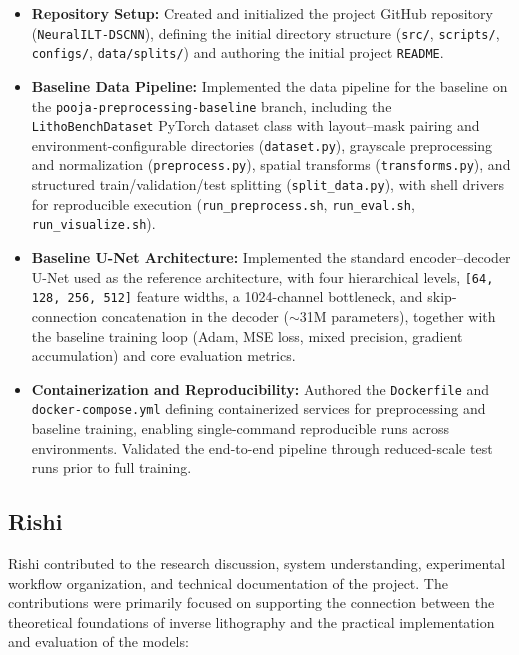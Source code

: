 \documentclass[conference]{IEEEtran}
\begin{document}
\begin{itemize}
    \item \textbf{Repository Setup:} Created and initialized the project GitHub repository (\texttt{NeuralILT-DSCNN}), defining the initial directory structure (\texttt{src/}, \texttt{scripts/}, \texttt{configs/}, \texttt{data/splits/}) and authoring the initial project \texttt{README}.

    \item \textbf{Baseline Data Pipeline:} Implemented the data pipeline for the baseline on the \texttt{pooja-preprocessing-baseline} branch, including the \texttt{LithoBenchDataset} PyTorch dataset class with layout--mask pairing and environment-configurable directories (\texttt{dataset.py}), grayscale preprocessing and normalization (\texttt{preprocess.py}), spatial transforms (\texttt{transforms.py}), and structured train/validation/test splitting (\texttt{split\_data.py}), with shell drivers for reproducible execution (\texttt{run\_preprocess.sh}, \texttt{run\_eval.sh}, \texttt{run\_visualize.sh}).

    \item \textbf{Baseline U-Net Architecture:} Implemented the standard encoder--decoder U-Net used as the reference architecture, with four hierarchical levels, \texttt{[64, 128, 256, 512]} feature widths, a 1024-channel bottleneck, and skip-connection concatenation in the decoder ($\sim$31M parameters), together with the baseline training loop (Adam, MSE loss, mixed precision, gradient accumulation) and core evaluation metrics.

    \item \textbf{Containerization and Reproducibility:} Authored the \texttt{Dockerfile} and \texttt{docker-compose.yml} defining containerized services for preprocessing and baseline training, enabling single-command reproducible runs across environments. Validated the end-to-end pipeline through reduced-scale test runs prior to full training.
\end{itemize}

\subsection{\textbf{Rishi}}
Rishi contributed to the research discussion, system understanding, experimental workflow organization, and technical documentation of the project. The contributions were primarily focused on supporting the connection between the theoretical foundations of inverse lithography and the practical implementation and evaluation of the models:
\end{document}
